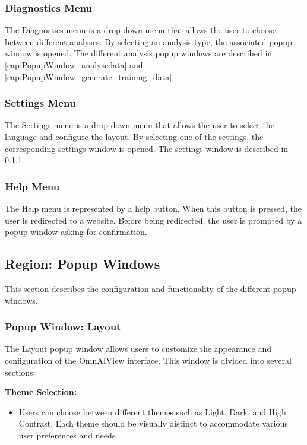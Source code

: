 \documentclass[]{scrreprt}
\begin{document}
\subsubsection{Diagnostics Menu}

The Diagnostics menu is a drop-down menu that allows the user to choose between different analyses. By selecting an analysis type, the associated popup window is opened. The different analysis popup windows are described in \ref{cap:PopupWindow_analysedata} and \ref{cap:PopupWindow_generate_training_data}.

\subsubsection{Settings Menu}

The Settings menu is a drop-down menu that allows the user to select the language and configure the layout. By selecting one of the settings, the corresponding settings window is opened. The settings window is described in \ref{cap:PopupWindow_layout}.

\subsubsection{Help Menu}

The Help menu is represented by a help button. When this button is pressed, the user is redirected to a website. Before being redirected, the user is prompted by a popup window asking for confirmation.

\subsection{Region: Popup Windows}

This section describes the configuration and functionality of the different popup windows. 

\subsubsection{Popup Window: Layout} \label{cap:PopupWindow_layout}

The Layout popup window allows users to customize the appearance and configuration of the OmnAIView interface. This window is divided into several sections:

\textbf{Theme Selection:}
\begin{itemize}
    \item Users can choose between different themes such as Light, Dark, and High Contrast. Each theme should be visually distinct to accommodate various user preferences and needs.
\end{itemize}
\end{document}
